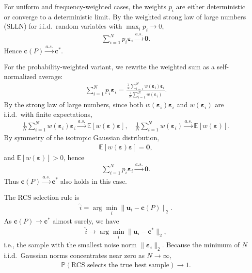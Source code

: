 For uniform and frequency-weighted cases, the weights \(p_i\) are either deterministic or converge to a deterministic limit. By the weighted strong law of large numbers (SLLN) for i.i.d.\ random variables with \(\max_i p_i \to 0\),
\begin{align}
\sum_{i=1}^N p_i \boldsymbol{\varepsilon}_i \xrightarrow{a.s.} \mathbf{0}.
\end{align}
Hence \(\mathbf{c}(P) \xrightarrow{a.s.} \mathbf{c}^*\).

For the probability-weighted variant, we rewrite the weighted sum as a self-normalized average:
\begin{align}
\sum_{i=1}^N p_i \boldsymbol{\varepsilon}_i
= \frac{\frac{1}{N}\sum_{i=1}^N w(\boldsymbol{\varepsilon}_i)\boldsymbol{\varepsilon}_i}{\frac{1}{N}\sum_{i=1}^N w(\boldsymbol{\varepsilon}_i)}.
\end{align}
By the strong law of large numbers, since both \(w(\boldsymbol{\varepsilon}_i)\boldsymbol{\varepsilon}_i\) and \(w(\boldsymbol{\varepsilon}_i)\) are i.i.d.\ with finite expectations,
\begin{align}
    \frac{1}{N}\sum_{i=1}^N w(\boldsymbol{\varepsilon}_i)\boldsymbol{\varepsilon}_i \xrightarrow{a.s.} \mathbb{E}[w(\boldsymbol{\varepsilon})\boldsymbol{\varepsilon}], 
    \quad
    \frac{1}{N}\sum_{i=1}^N w(\boldsymbol{\varepsilon}_i) \xrightarrow{a.s.} \mathbb{E}[w(\boldsymbol{\varepsilon})].    
\end{align}
By symmetry of the isotropic Gaussian distribution,
\begin{align}
    \mathbb{E}[w(\boldsymbol{\varepsilon})\boldsymbol{\varepsilon}] = \mathbf{0},
\end{align}
and \(\mathbb{E}[w(\boldsymbol{\varepsilon})] > 0\), hence
\begin{align}
    \sum_{i=1}^N p_i \boldsymbol{\varepsilon}_i \xrightarrow{a.s.} \mathbf{0}.
\end{align}
Thus \(\mathbf{c}(P) \xrightarrow{a.s.} \mathbf{c}^*\) also holds in this case.

The RCS selection rule is
\begin{align}
    \hat{i} = \arg\min_i \|\mathbf{u}_i - \mathbf{c}(P)\|_2.
\end{align}
As \(\mathbf{c}(P) \to \mathbf{c}^*\) almost surely, we have
\begin{align}
    \hat{i} \to \arg\min_i \|\mathbf{u}_i - \mathbf{c}^*\|_2,
\end{align}
i.e., the sample with the smallest noise norm \(\|\boldsymbol{\varepsilon}_i\|_2\). Because the minimum of \(N\) i.i.d.\ Gaussian norms concentrates near zero as \(N \to \infty\), 
\begin{align}
    \mathbb{P}(\text{RCS selects the true best sample}) \to 1.
\end{align}

